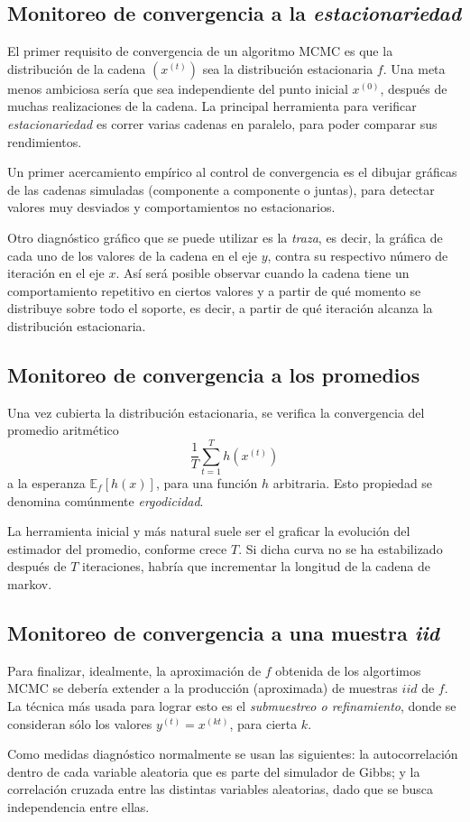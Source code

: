 \subsection{Monitoreo de convergencia a la \textit{estacionariedad}}

El primer requisito de convergencia de un algoritmo MCMC es que la distribución de la cadena $(x^{(t)})$ sea la distribución estacionaria $f$. Una meta menos ambiciosa sería que sea independiente del punto inicial $x^{(0)}$, después de muchas realizaciones de la cadena. La principal herramienta para verificar \textit{estacionariedad} es correr varias cadenas en paralelo, para poder comparar sus rendimientos. 

Un primer acercamiento empírico al control de convergencia es el dibujar gráficas de las cadenas simuladas (componente a componente o juntas), para detectar valores muy desviados y comportamientos no estacionarios. 

Otro diagnóstico gráfico que se puede utilizar es la \textit{traza}, es decir, la gr\'afica de cada uno de los valores de la cadena en el eje $y$, contra su respectivo n\'umero de iteraci\'on en el eje $x$. As\'i ser\'a posible observar cuando la cadena tiene un comportamiento repetitivo en ciertos valores y a partir de qu\'e momento se distribuye sobre todo el soporte, es decir, a partir de qu\'e iteraci\'on alcanza la distribuci\'on estacionaria. 

\subsection{Monitoreo de convergencia a los promedios}

Una vez cubierta la distribución estacionaria, se verifica la convergencia del promedio aritmético
\begin{equation*}
    \frac{1}{T}\sum_{t=1}^T h(x^{(t)})
\end{equation*}
a la esperanza $\mathbb{E}_f[h(x)]$, para una función $h$ arbitraria. Esto propiedad se denomina com\'unmente \textit{ergodicidad}.

La herramienta inicial y más natural suele ser el graficar la evolución del estimador del promedio, conforme crece $T$. Si dicha curva no se ha estabilizado después de $T$ iteraciones, habría que incrementar la longitud de la cadena de markov.

\subsection{Monitoreo de convergencia a una muestra \textit{iid}}

Para finalizar, idealmente, la aproximación de $f$ obtenida de los algortimos MCMC se debería extender a la producción (aproximada) de muestras $iid$ de $f$. La técnica más usada para lograr esto es el \textit{submuestreo o refinamiento}, donde se consideran s\'olo los valores $y^{(t)} = x^{(kt)}$, para cierta $k$.

Como medidas diagn\'ostico normalmente se usan las siguientes: la autocorrelaci\'on dentro de cada variable aleatoria que es parte del simulador de Gibbs; y la correlaci\'on cruzada entre las distintas variables aleatorias, dado que se busca independencia entre ellas.

\newpage